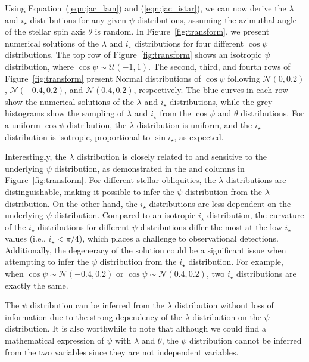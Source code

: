 \documentclass[twocolumn,times]{aastex631}
\begin{document}
Using Equation~(\ref{eqn:jac_lam}) and (\ref{eqn:jac_istar}), we can now derive the $\lambda$ and $i_\star$ distributions for any given $\psi$ distributions, assuming the azimuthal angle of the stellar spin axis $\theta$ is random. In Figure~\ref{fig:transform}, we present numerical solutions of the $\lambda$ and $i_\star$ distributions for four different $\cos{\psi}$ distributions. The top row of Figure~\ref{fig:transform} shows an isotropic $\psi$ distribution, where $\cos{\psi} \sim \mathcal{U}(-1,1)$. The second, third, and fourth rows of Figure~\ref{fig:transform} present Normal distributions of $\cos{\psi}$ following $\mathcal{N}(0,0.2)$, $\mathcal{N}(-0.4,0.2)$, and $\mathcal{N}(0.4,0.2)$, respectively. 
The blue curves in each row show the numerical solutions of the $\lambda$ and $i_\star$ distributions, while the grey histograms show the sampling of $\lambda$ and $i_\star$ from the $\cos{\psi}$ and $\theta$ distributions. 
For a uniform $\cos{\psi}$ distribution, the $\lambda$ distribution is uniform, and the $i_\star$ distribution is isotropic, proportional to $\sin{i_\star}$, as expected.

Interestingly, the $\lambda$ distribution is closely related to and sensitive to the underlying $\psi$ distribution, as demonstrated in the  and  columns in Figure~\ref{fig:transform}. For different stellar obliquities, the $\lambda$ distributions are distinguishable, making it possible to infer the $\psi$ distribution from the $\lambda$ distribution. On the other hand, the $i_\star$ distributions are less dependent on the underlying $\psi$ distribution. Compared to an isotropic $i_\star$ distribution, the curvature of the $i_\star$ distributions for different $\psi$ distributions differ the most at the low $i_\star$ values (i.e., $i_\star < \pi/4$), which places a challenge to observational detections. 
Additionally, the degeneracy of the solution could be a significant issue when attempting to infer the $\psi$ distribution from the $i_\star$ distribution. For example, when $\cos{\psi} \sim \mathcal{N}(-0.4,0.2)$ or $\cos{\psi} \sim \mathcal{N}(0.4,0.2)$, two $i_\star$ distributions are exactly the same.

The $\psi$ distribution can be inferred from the $\lambda$ distribution without loss of information due to the strong dependency of the $\lambda$ distribution on the $\psi$ distribution. It is also worthwhile to note that although we could find a mathematical expression of $\psi$ with $\lambda$ and $\theta$, the $\psi$ distribution cannot be inferred from the two variables since they are not independent variables.
\end{document}
